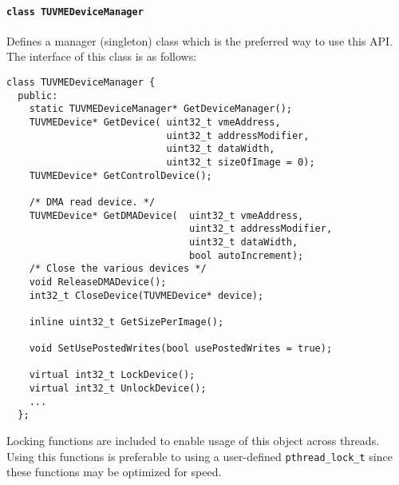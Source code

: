 				\paragraph{\lstinline!class TUVMEDeviceManager!}
Defines a manager (singleton) class which is the preferred way to use this API.
The interface of this class is as follows:
					\begin{lstlisting}
class TUVMEDeviceManager {
  public:
    static TUVMEDeviceManager* GetDeviceManager();
    TUVMEDevice* GetDevice(	uint32_t vmeAddress, 
      						uint32_t addressModifier, 
							uint32_t dataWidth, 
							uint32_t sizeOfImage = 0);
    TUVMEDevice* GetControlDevice(); 

    /* DMA read device. */
    TUVMEDevice* GetDMADevice(	uint32_t vmeAddress, 
      							uint32_t addressModifier, 
								uint32_t dataWidth, 
      							bool autoIncrement);
    /* Close the various devices */
    void ReleaseDMADevice(); 
    int32_t CloseDevice(TUVMEDevice* device);

    inline uint32_t GetSizePerImage(); 
    
    void SetUsePostedWrites(bool usePostedWrites = true); 
    
    virtual int32_t LockDevice(); 
    virtual int32_t UnlockDevice(); 
    ...
  };

					\end{lstlisting}
Locking functions are included to enable usage of this object across threads.  Using this
functions is preferable to using a user-defined \lstinline!pthread_lock_t! since 
these functions may be optimized for speed.  

